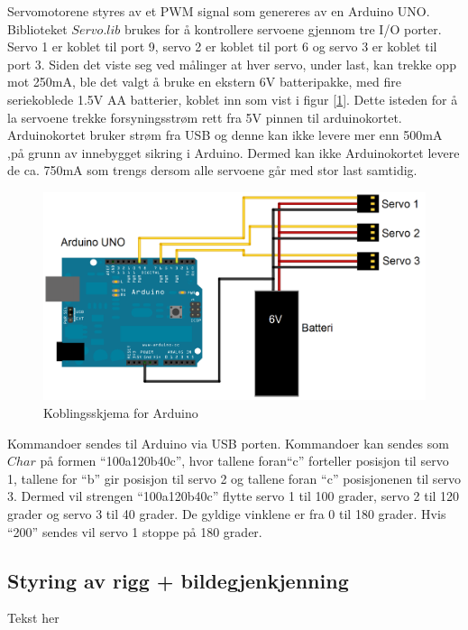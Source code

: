 Servomotorene styres av et PWM signal som genereres av en Arduino UNO. Biblioteket $Servo.lib$ brukes for å kontrollere servoene gjennom tre I/O porter. Servo 1 er koblet til port 9, servo 2 er koblet til port 6 og servo 3 er koblet til port 3. Siden det viste seg ved målinger at hver servo, under last, kan trekke opp mot 250mA, ble det valgt å bruke en ekstern 6V batteripakke, med fire seriekoblede 1.5V AA batterier, koblet inn som vist i figur [\ref{fig:ArduSkjem}]. Dette isteden for å la servoene trekke forsyningsstrøm rett fra 5V pinnen til arduinokortet. Arduinokortet bruker strøm fra USB og denne kan ikke levere mer enn 500mA ,på grunn av innebygget sikring i Arduino. Dermed kan ikke Arduinokortet levere de ca. 750mA som trengs dersom alle servoene går med stor last samtidig. 

\begin{figure}[h!]
	\centering
	\includegraphics[scale=0.25]{img/KoblingsskjemaArduino.png}
	\caption{Koblingsskjema for Arduino}
	\label{fig:ArduSkjem}
\end{figure}  

Kommandoer sendes til Arduino via USB porten. Kommandoer kan sendes som $Char$ på formen ``100a120b40c'', hvor tallene foran``c'' forteller posisjon til servo 1, tallene for ``b'' gir posisjon til servo 2 og tallene foran ``c'' posisjonenen til servo 3. Dermed vil strengen ``100a120b40c'' flytte servo 1 til 100 grader, servo 2 til 120 grader og servo 3 til 40 grader. De gyldige vinklene er fra 0 til 180 grader. Hvis ``200'' sendes vil servo 1 stoppe på 180 grader. 


\subsection{Styring av rigg + bildegjenkjenning}

Tekst her
